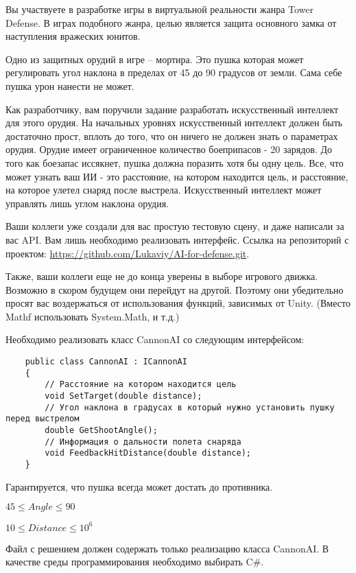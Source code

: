 
Вы участвуете в разработке игры в виртуальной реальности жанра Tower Defense. В играх подобного жанра, целью является защита основного замка от наступления вражеских юнитов.

Одно из защитных орудий в игре -- мортира. Это пушка которая может регулировать угол наклона в пределах от 45 до 90 градусов от земли. Сама себе пушка урон нанести не может.

Как разработчику, вам поручили задание разработать искусственный интеллект для этого орудия. На начальных уровнях искусственный интеллект должен быть достаточно прост, вплоть до того, что он ничего не должен знать о параметрах орудия. Орудие имеет ограниченное количество боеприпасов - 20 зарядов. До того как боезапас иссякнет, пушка должна поразить хотя бы одну цель. Все, что может узнать ваш ИИ - это расстояние, на котором находится цель, и расстояние, на которое улетел снаряд после выстрела. Искусственный интеллект может управлять лишь углом наклона орудия.

Ваши коллеги уже создали для вас простую тестовую сцену, и даже написали за вас API. Вам лишь необходимо реализовать интерфейс. Ссылка на репозиторий с проектом: \url{https://github.com/Lukaviy/AI-for-defense.git}.

Также, ваши коллеги еще не до конца уверены в выборе игрового движка. Возможно в скором будущем они перейдут на другой. Поэтому они убедительно просят вас воздержаться от использования функций, зависимых от Unity. (Вместо Mathf использовать System.Math, и т.д.)

Необходимо реализовать класс CannonAI со следующим интерфейсом:

\begin{verbatim}
    public class CannonAI : ICannonAI
    {
        // Расстояние на котором находится цель
        void SetTarget(double distance);
        // Угол наклона в градусах в который нужно установить пушку перед выстрелом
        double GetShootAngle();
        // Информация о дальности полета снаряда
        void FeedbackHitDistance(double distance);
    }
\end{verbatim}


Гарантируется, что пушка всегда может достать до противника.

$45\leq Angle \leq 90$

$10\leq Distance \leq 10^6$
        
\outputfmtSection

Файл с решением должен содержать только реализацию класса CannonAI. В качестве среды программирования необходимо выбирать C\#.

